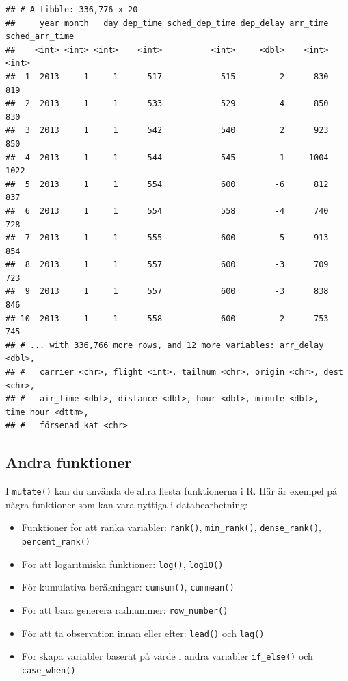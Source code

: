 \documentclass[
]{book}
\providecommand{\tightlist}{%
  \setlength{\itemsep}{0pt}\setlength{\parskip}{0pt}}
\begin{document}
\begin{verbatim}
## # A tibble: 336,776 x 20
##     year month   day dep_time sched_dep_time dep_delay arr_time sched_arr_time
##    <int> <int> <int>    <int>          <int>     <dbl>    <int>          <int>
##  1  2013     1     1      517            515         2      830            819
##  2  2013     1     1      533            529         4      850            830
##  3  2013     1     1      542            540         2      923            850
##  4  2013     1     1      544            545        -1     1004           1022
##  5  2013     1     1      554            600        -6      812            837
##  6  2013     1     1      554            558        -4      740            728
##  7  2013     1     1      555            600        -5      913            854
##  8  2013     1     1      557            600        -3      709            723
##  9  2013     1     1      557            600        -3      838            846
## 10  2013     1     1      558            600        -2      753            745
## # ... with 336,766 more rows, and 12 more variables: arr_delay <dbl>,
## #   carrier <chr>, flight <int>, tailnum <chr>, origin <chr>, dest <chr>,
## #   air_time <dbl>, distance <dbl>, hour <dbl>, minute <dbl>, time_hour <dttm>,
## #   försenad_kat <chr>
\end{verbatim}

\hypertarget{andra-funktioner}{%
\subsection{Andra funktioner}\label{andra-funktioner}}

I \texttt{mutate()} kan du använda de allra flesta funktionerna i R. Här är exempel på några funktioner som kan vara nyttiga i databearbetning:

\begin{itemize}
\tightlist
\item
  Funktioner för att ranka variabler: \texttt{rank()}, \texttt{min\_rank()}, \texttt{dense\_rank()}, \texttt{percent\_rank()}
\item
  För att logaritmiska funktioner: \texttt{log()}, \texttt{log10()}
\item
  För kumulativa beräkningar: \texttt{cumsum()}, \texttt{cummean()}
\item
  För att bara generera radnummer: \texttt{row\_number()}
\item
  För att ta observation innan eller efter: \texttt{lead()} och \texttt{lag()}
\item
  För skapa variabler baserat på värde i andra variabler \texttt{if\_else()} och \texttt{case\_when()}
\end{itemize}
\end{document}
